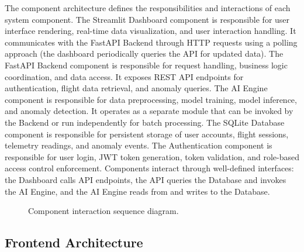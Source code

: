 The component architecture defines the responsibilities and interactions of each system component. The Streamlit Dashboard component is responsible for user interface rendering, real-time data visualization, and user interaction handling. It communicates with the FastAPI Backend through HTTP requests using a polling approach (the dashboard periodically queries the API for updated data). The FastAPI Backend component is responsible for request handling, business logic coordination, and data access. It exposes REST API endpoints for authentication, flight data retrieval, and anomaly queries. The AI Engine component is responsible for data preprocessing, model training, model inference, and anomaly detection. It operates as a separate module that can be invoked by the Backend or run independently for batch processing. The SQLite Database component is responsible for persistent storage of user accounts, flight sessions, telemetry readings, and anomaly events. The Authentication component is responsible for user login, JWT token generation, token validation, and role-based access control enforcement. Components interact through well-defined interfaces: the Dashboard calls API endpoints, the API queries the Database and invokes the AI Engine, and the AI Engine reads from and writes to the Database.

\begin{figure}[H]
\centering
\caption{Component interaction sequence diagram.}
\label{fig:component_interaction}
\end{figure}

\subsection{Frontend Architecture}

